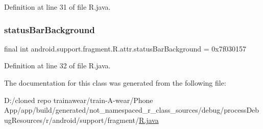 Definition at line 31 of file R.\+java.

\mbox{\label{classandroid_1_1support_1_1fragment_1_1_r_1_1attr_a6bf491fb07f26af1dcd59e25a7fa709a}} 
\subsubsection{\texorpdfstring{statusBarBackground}{statusBarBackground}}
{\footnotesize\ttfamily final int android.\+support.\+fragment.\+R.\+attr.\+status\+Bar\+Background = 0x7f030157\hspace{0.3cm}{\ttfamily [static]}}



Definition at line 32 of file R.\+java.



The documentation for this class was generated from the following file\+:\begin{DoxyCompactItemize}
\item 
D\+:/cloned repo trainawear/train-\/\+A-\/wear/\+Phone App/app/build/generated/not\+\_\+namespaced\+\_\+r\+\_\+class\+\_\+sources/debug/process\+Debug\+Resources/r/android/support/fragment/\mbox{\hyperlink{process_debug_resources_2r_2android_2support_2fragment_2_r_8java}{R.\+java}}\end{DoxyCompactItemize}
